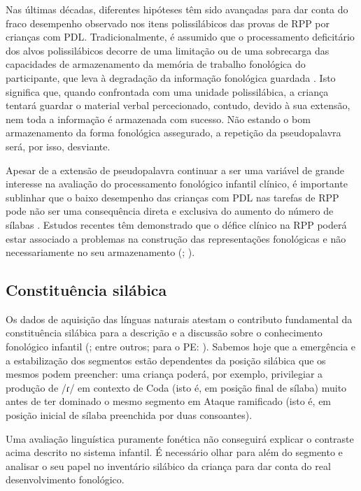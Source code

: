 \documentclass[output=paper,colorlinks,citecolor=brown,booklanguage=portuguese]{langscibook}
\begin{document}
Nas últimas décadas, diferentes hipóteses têm sido avançadas para dar conta do fraco desempenho observado nos itens polissilábicos das provas de RPP por crianças com PDL. Tradicionalmente, é assumido que o processamento deficitário dos alvos polissilábicos decorre de uma limitação ou de uma sobrecarga das capacidades de armazenamento da memória de trabalho fonológica do participante, que leva à degradação da informação fonológica guardada \citep{Gathercole2006}. Isto significa que, quando confrontada com uma unidade polissilábica, a criança tentará guardar o material verbal percecionado, contudo, devido à sua extensão, nem toda a informação é armazenada com sucesso. Não estando o bom armazenamento da forma fonológica assegurado, a repetição da pseudopalavra será, por isso, desviante.

Apesar de a extensão de pseudopalavra continuar a ser uma variável de grande interesse na avaliação do processamento fonológico infantil clínico, é importante sublinhar que o baixo desempenho das crianças com PDL nas tarefas de RPP pode não ser uma consequência direta e exclusiva do aumento do número de sílabas \citep{Gallon2007, Estes2007, Marshall2002, Snowling1991}. Estudos recentes têm demonstrado que o défice clínico na RPP poderá estar associado a problemas na construção das representações fonológicas e não necessariamente no seu armazenamento (\citealp{Almeida2019, Ferre2015a, Gallon2007}; \citealp[45]{Marshall2002}).

\subsection{Constituência silábica}
Os dados de aquisição das línguas naturais atestam o contributo fundamental da constituência silábica para a descrição e a discussão sobre o conhecimento fonológico infantil (\citealp{Almeida2011, Fikkert1994}; entre outros; para o PE: \citealp{Amorim2014, Freitas2017, Ramalho2017}). Sabemos hoje que a emergência e a estabilização dos segmentos estão dependentes da posição silábica que os mesmos podem preencher: uma criança poderá, por exemplo, privilegiar a produção de /ɾ/ em contexto de Coda (isto é, em posição final de sílaba) muito antes de ter dominado o mesmo segmento em Ataque ramificado (isto é, em posição inicial de sílaba preenchida por duas consoantes).

Uma avaliação linguística puramente fonética não conseguirá explicar o contraste acima descrito no sistema infantil. É necessário olhar para além do segmento e analisar o seu papel no inventário silábico da criança para dar conta do real desenvolvimento fonológico.
\end{document}
